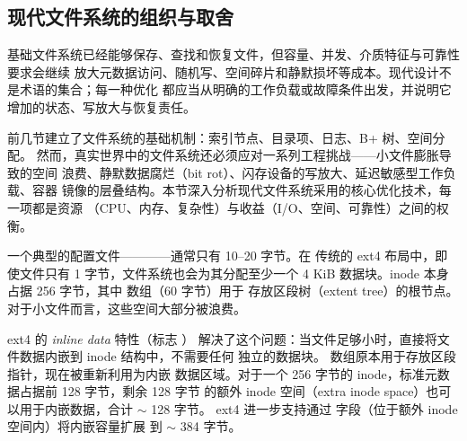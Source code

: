 \begin{filesystemlayout}

\chapter{现代文件系统的组织与取舍}
\begin{keyidea}
基础文件系统已经能够保存、查找和恢复文件，但容量、并发、介质特征与可靠性要求会继续
放大元数据访问、随机写、空间碎片和静默损坏等成本。现代设计不是术语的集合；每一种优化
都应当从明确的工作负载或故障条件出发，并说明它增加的状态、写放大与恢复责任。
\end{keyidea}


前几节建立了文件系统的基础机制：索引节点、目录项、日志、B+ 树、空间分配。
然而，真实世界中的文件系统还必须应对一系列工程挑战——小文件膨胀导致的空间
浪费、静默数据腐烂（bit rot）、闪存设备的写放大、延迟敏感型工作负载、容器
镜像的层叠结构。本节深入分析现代文件系统采用的核心优化技术，每一项都是资源
（CPU、内存、复杂性）与收益（I/O、空间、可靠性）之间的权衡。


一个典型的配置文件————通常只有 10--20 字节。在
传统的 ext4 布局中，即使文件只有 1 字节，文件系统也会为其分配至少一个 4 KiB
数据块。inode 本身占据 256 字节，其中  数组（60 字节）用于
存放区段树（extent tree）的根节点。对于小文件而言，这些空间大部分被浪费。

ext4 的 \emph{inline data} 特性（标志 ）
解决了这个问题：当文件足够小时，直接将文件数据内嵌到 inode 结构中，不需要任何
独立的数据块。 数组原本用于存放区段指针，现在被重新利用为内嵌
数据区域。对于一个 256 字节的 inode，标准元数据占据前 128 字节，剩余 128 字节
的额外 inode 空间（extra inode space）也可以用于内嵌数据，合计 $\sim$ 128 字节。
ext4 进一步支持通过  字段（位于额外 inode 空间内）将内嵌容量扩展
到 $\sim$ 384 字节。


\end{filesystemlayout}

